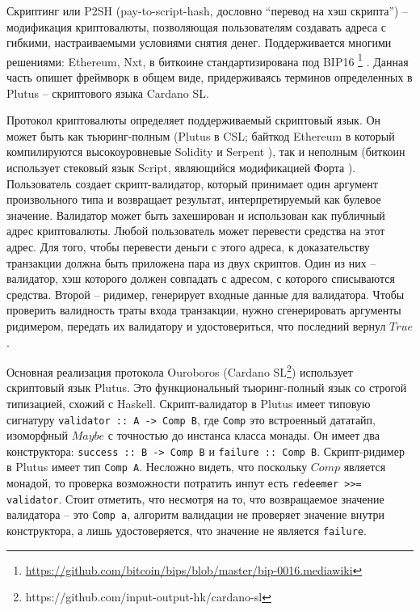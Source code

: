 \documentclass[specification,annotation]{itmo-student-thesis}
\begin{document}
Скриптинг или P2SH (pay-to-script-hash, дословно ``перевод на хэш
скрипта'') -- модификация криптовалюты, позволяющая пользователям
создавать адреса с гибкими, настраиваемыми условиями снятия
денег. Поддерживается многими решениями: Ethereum, Nxt, в биткоине
стандартизирована под
BIP16 \footnote{\url{https://github.com/bitcoin/bips/blob/master/bip-0016.mediawiki}}
\cite{seijas2016scripting}. Данная часть опишет фреймворк в общем
виде, придерживаясь терминов определенных в Plutus \cite{plutus} --
скриптового языка Cardano SL.

Протокол криптовалюты определяет поддерживаемый скриптовый язык. Он
может быть как тьюринг-полным (Plutus в CSL; байткод Ethereum в
который компилируются высокоуровневые Solidity \cite{solidity} и
Serpent \cite{serpent}), так и неполным (биткоин использует стековый
язык Script, являющийся модификацией Форта
\cite{bitcoinwikiscript}). Пользователь создает скрипт-валидатор,
который принимает один аргумент произвольного типа и возвращает
результат, интерпретируемый как булевое значение. Валидатор может быть
захеширован и использован как публичный адрес криптовалюты. Любой
пользователь может перевести средства на этот адрес. Для того, чтобы
перевести деньги с этого адреса, к доказательству транзакции должна
быть приложена пара из двух скриптов. Один из них -- валидатор, хэш
которого должен совпадать с адресом, с которого списываются
средства. Второй -- ридимер, генерирует входные данные для
валидатора. Чтобы проверить валидность траты входа транзакции, нужно
сгенерировать аргументы ридимером, передать их валидатору и
удостовериться, что последний вернул $True$.

Основная реализация протокола Ouroboros (Cardano
SL\footnote{https://github.com/input-output-hk/cardano-sl}) использует
скриптовый язык Plutus. Это функциональный тьюринг-полный язык со
строгой типизацией, схожий с Haskell. Скрипт-валидатор в Plutus имеет
типовую сигнатуру \lstinline|validator :: A -> Comp B|, где
\lstinline|Comp| это встроенный дататайп, изоморфный $Maybe$ с
точностью до инстанса класса монады. Он имеет два конструктора:
\lstinline|success :: B -> Comp B| и \lstinline|failure :: Comp B|.
Скрипт-ридимер в Plutus имеет тип \lstinline|Comp A|. Несложно видеть,
что поскольку $Comp$ является монадой, то проверка возможности
потратить инпут есть \lstinline|redeemer >>= validator|. Стоит
отметить, что несмотря на то, что возвращаемое значение валидатора --
это \lstinline|Comp a|, алгоритм валидации не проверяет значение
внутри конструктора, а лишь удостоверяется, что значение не является
\lstinline|failure|.
\end{document}
